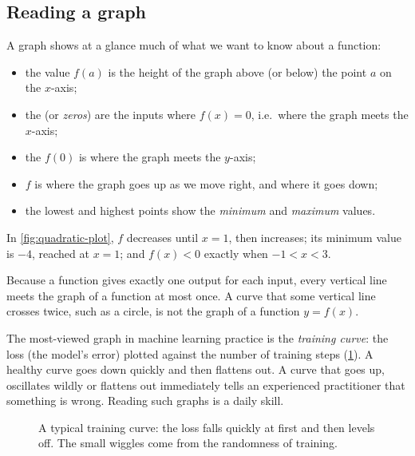 \subsection{Reading a graph}

A graph shows at a glance much of what we want to know about a function:
\begin{itemize}
  \item the value $f(a)$ is the height of the graph above (or below) the point
    $a$ on the $x$-axis;
  \item the  (or \emph{zeros}) are the inputs
    where $f(x) = 0$, i.e.\ where the graph meets the $x$-axis;
  \item the  $f(0)$ is where the graph meets the $y$-axis;
  \item $f$ is  where the graph goes up
    as we move right, and  where it goes
    down;
  \item the lowest and highest points show the \emph{minimum} and
    \emph{maximum} values.
\end{itemize}
In \cref{fig:quadratic-plot}, $f$ decreases until $x = 1$, then increases; its
minimum value is $-4$, reached at $x = 1$; and $f(x) < 0$ exactly when
$-1 < x < 3$.

\begin{remark}
Because a function gives exactly one output for each input, every vertical
line meets the graph of a function at most once. A curve that some vertical
line crosses twice, such as a circle, is not the graph of a function $y=f(x)$.
\end{remark}

\begin{mlnote}
The most-viewed graph in machine learning practice is the \emph{training
curve}: the loss (the model's error) plotted against the number of training
steps (\cref{fig:training-curve}). A healthy curve goes down quickly and then
flattens out. A curve that goes up, oscillates wildly or flattens out
immediately tells an experienced practitioner that something is wrong.
Reading such graphs is a daily skill.
\end{mlnote}

\begin{figure}[htbp]
\centering
{}
\caption{A typical training curve: the loss falls quickly at first and then
  levels off. The small wiggles come from the randomness of training.}
\label{fig:training-curve}
\end{figure}

